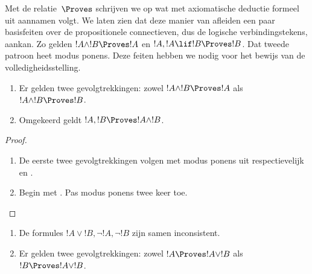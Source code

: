 \documentclass[../../../include/open-logic-section]{subfiles}
\begin{document}
      {}
      {}


\begin{explain}
  Met de relatie~$\Proves$ schrijven we op wat met axiomatische
  deductie formeel uit aannamen volgt. We laten zien dat deze manier
  van afleiden een paar basisfeiten over de propositionele
  connectieven, dus de logische verbindingstekens, aankan. Zo gelden
  $!A \land !B \Proves !A$ en $!A, !A \lif !B \Proves !B$. Dat tweede
  patroon heet modus ponens. Deze feiten hebben we nodig voor het
  bewijs van de volledigheidsstelling.
\end{explain}

\begin{prop}
  \begin{enumerate}
  \item {} Er gelden twee
    gevolgtrekkingen: zowel $!A \land !B \Proves !A$ als
    $!A \land !B \Proves !B$.
  \item {} Omgekeerd geldt
    $!A, !B \Proves !A \land !B$.
  \end{enumerate}
\end{prop}

\begin{proof}
  \begin{enumerate}
    \item De eerste twee gevolgtrekkingen volgen met modus ponens uit
      respectievelijk  en
      .
  \item Begin met . Pas modus ponens twee keer
    toe.
  \end{enumerate}
\end{proof}


\begin{prop}
  \begin{enumerate}
  \item De formules $!A \lor !B, \lnot !A, \lnot !B$ zijn samen
    inconsistent.
  \item Er gelden twee gevolgtrekkingen: zowel
    $!A \Proves !A \lor !B$ als $!B \Proves !A \lor !B$.
  \end{enumerate}
\end{prop}
\end{document}
